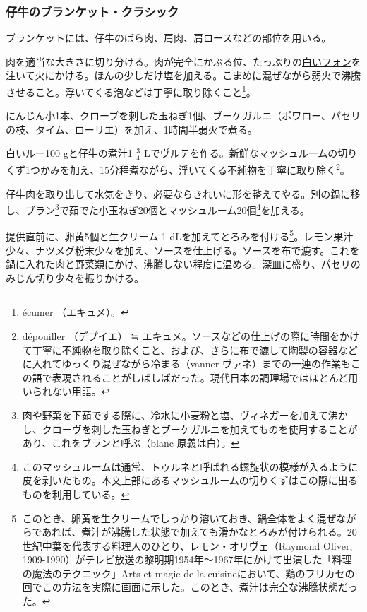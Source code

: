 \hypertarget{blanquette-de-veau-a-l-ancienne}{%
\subsubsection{仔牛のブランケット・クラシック}\label{blanquette-de-veau-a-l-ancienne}}


ブランケットには、仔牛のばら肉、肩肉、肩ロースなどの部位を用いる。

肉を適当な大きさに切り分ける。肉が完全にかぶる位、たっぷりの\protect\hyperlink{fonds-blanc-ordinaire}{白いフォン}を注いて火にかける。ほんの少しだけ塩を加える。こまめに混ぜながら弱火で沸騰させること。浮いてくる泡などは丁寧に取り除くこと\footnote{écumer
  （エキュメ）。}。

にんじん小1本、クローブを刺した玉ねぎ1個、ブーケガルニ（ポワロー、パセリの枝、タイム、ローリエ）を加え、1時間半弱火で煮る。

\protect\hyperlink{roux-blanc}{白いルー}100 gと仔牛の煮汁1
\(\frac{3}{4}\)
Lで\protect\hyperlink{veloute}{ヴルテ}を作る。新鮮なマッシュルームの切りくず1つかみを加え、15分程煮ながら、浮いてくる不純物を丁寧に取り除く\footnote{dépouiller
  （デプイエ） ≒
  エキュメ。ソースなどの仕上げの際に時間をかけて丁寧に不純物を取り除くこと、および、さらに布で漉して陶製の容器などに入れてゆっくり混ぜながら冷まる（vanner
  ヴァネ）までの一連の作業もこの語で表現されることがしばしばだった。現代日本の調理場ではほとんど用いられない用語。}。

仔牛肉を取り出して水気をきり、必要ならきれいに形を整えてやる。別の鍋に移し、ブラン\footnote{肉や野菜を下茹でする際に、冷水に小麦粉と塩、ヴィネガーを加えて沸かし、クローヴを刺した玉ねぎとブーケガルニを加えてものを使用することがあり、これをブランと呼ぶ（blanc
  原義は白）。}で茹でた小玉ねぎ20個とマッシュルーム20個\footnote{このマッシュルームは通常、トゥルネと呼ばれる螺旋状の模様が入るように皮を剥いたもの。本文上部にあるマッシュルームの切りくずはこの際に出るものを利用している。}を加える。

提供直前に、卵黄5個と生クリーム 1 dLを加えてとろみを付ける\footnote{このとき、卵黄を生クリームでしっかり溶いておき、鍋全体をよく混ぜながらであれば、煮汁が沸騰した状態で加えても滑かなとろみが付けられる。20世紀中葉を代表する料理人のひとり、レモン・オリヴェ（Raymond
  Oliver,
  1909-1990）がテレビ放送の黎明期1954年〜1967年にかけて出演した「料理の魔法のテクニック」Arts
  et magie de la
  cuisineにおいて、鶏のフリカセの回でこの方法を実際に画面に示した。このとき、煮汁は完全な沸騰状態だった。}。レモン果汁少々、ナツメグ粉末少々を加え、ソースを仕上げる。ソースを布で漉す。これを鍋に入れた肉と野菜類にかけ、沸騰しない程度に温める。深皿に盛り、パセリのみじん切り少々を振りかける。
